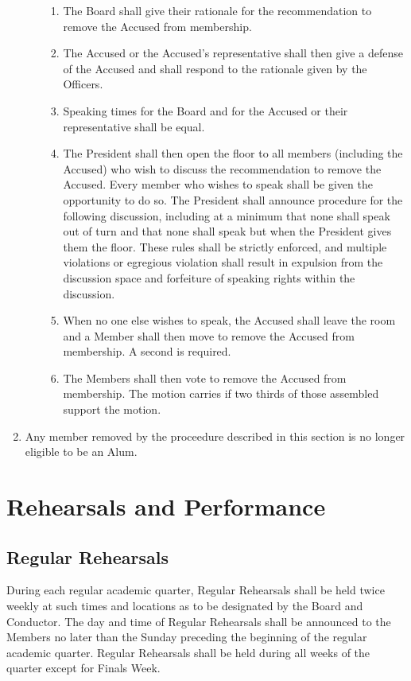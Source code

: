 \documentclass{article}
\begin{document}
\begin{enumerate}
\begin{enumerate}
\begin{enumerate}
\item The Board shall give their rationale for the recommendation to
remove the Accused from membership.
\item The Accused or the Accused's representative shall then give a defense
of the Accused and shall respond to the rationale given by the Officers.
\item Speaking times for the Board and for the Accused or their representative
shall be equal.
\item The President shall then open the floor to all members (including the
  Accused) who wish to discuss the recommendation to remove the Accused. Every
  member who wishes to speak shall be given the opportunity to do so. The
  President shall announce procedure for the following discussion, including at
  a minimum that none shall speak out of turn and that none shall speak but when
  the President gives them the floor. These rules shall be strictly enforced,
  and multiple violations or egregious violation shall result in expulsion from
  the discussion space and forfeiture of speaking rights within the discussion.
\item When no one else wishes to speak, the Accused shall leave the room
and a Member shall then move to remove the Accused from membership.
A second is required.
\item The Members shall then vote to remove the Accused from membership.
The motion carries if two thirds of those assembled support the motion.
\end{enumerate}
\end{enumerate}
\item Any member removed by the proceedure described in this section is no
  longer eligible to be an Alum.
\end{enumerate}

\section{Rehearsals and Performance}

\subsection{Regular Rehearsals}

During each regular academic quarter, Regular Rehearsals shall be held twice
weekly at such times and locations as to be designated by the Board and
Conductor. The day and time of Regular Rehearsals shall be announced to the
Members no later than the Sunday preceding the beginning of the regular academic
quarter. Regular Rehearsals shall be held during all weeks of the quarter except
for Finals Week.
\end{document}
